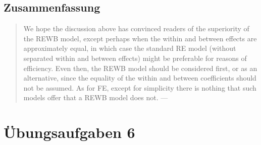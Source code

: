 \documentclass[
]{book}
\begin{document}
\hypertarget{zusammenfassung}{%
\subsection*{Zusammenfassung}\label{zusammenfassung}}

\begin{quote}
We hope the discussion above has convinced readers of the superiority of the REWB model, except perhaps when the within and between effects are approximately equal, in which case the standard RE model (without separated within and between effects) might be preferable for reasons of efficiency. Even then, the REWB model should be considered first, or as an alternative, since the equality of the within and between coefficients should not be assumed. As for FE, except for simplicity there is nothing that such models offer that a REWB model does not. --- \citet{bellFixedRandomEffects2019}
\end{quote}

\hypertarget{uxfcbungsaufgaben-6}{%
\section{Übungsaufgaben 6}\label{uxfcbungsaufgaben-6}}
\end{document}
